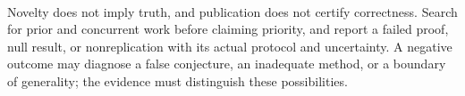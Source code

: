\begin{warning} \label{warn:novelty-and-negative-results} \\
Novelty does not imply truth, and publication does not certify correctness. Search for prior and concurrent work before claiming priority, and report a failed proof, null result, or nonreplication with its actual protocol and uncertainty. A negative outcome may diagnose a false conjecture, an inadequate method, or a boundary of generality; the evidence must distinguish these possibilities.
\end{warning}
